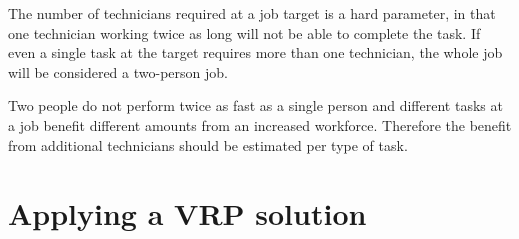 The number of technicians required at a job target is a hard parameter, in that one technician working twice as long will not be able to complete the task. If even a single task at the target requires more than one technician, the whole job will be considered a two-person job. 

Two people do not perform twice as fast as a single person and different tasks at a job benefit different amounts from an increased workforce. Therefore the benefit from additional technicians should be estimated per type of task. 







\section{Applying a VRP solution}
\label{section:vrp_apply}

